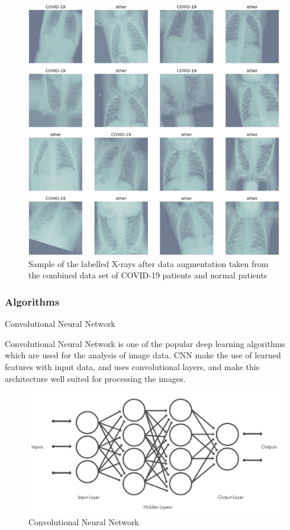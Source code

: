 \begin{figure}[!h]
    \centering
        \includegraphics[width=\textwidth]{assets/chest.png}
    \caption{Sample of the labelled X-rays after data augmentation taken from the combined data set of COVID-19 patients and normal patients }
    \label{chest_image}
\end{figure}

\subsubsection{Algorithms}

Convolutional Neural Network

Convolutional Neural Network is one of the popular deep learning algorithms which are used for the analysis of image data. CNN make the use of learned features with input data, and uses convolutional layers, and make this architecture well suited for processing the images. 

 

 
\begin{figure}[!h]
    \centering
    \includegraphics[width=\textwidth]{assets/cnn1.png}
    \caption{Convolutional Neural Network}
\end{figure}
 

